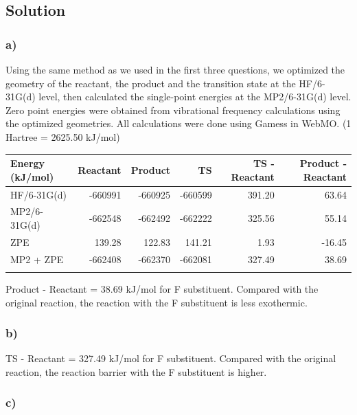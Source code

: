 \documentclass[11pt]{article}
\begin{document}
\subsection{Solution}
\label{sec:orgdc02afd}

\subsubsection{a)}
\label{sec:orga95c7f9}

Using the same method as we used in the first three questions, we optimized the geometry of the reactant, the product and the transition state at the HF/6-31G(d) level, then calculated the single-point energies at the MP2/6-31G(d) level. Zero point energies were obtained from vibrational frequency calculations using the optimized geometries. All calculations were done using Gamess in WebMO. (1 Hartree = 2625.50 kJ/mol)

\begin{center}
\begin{tabular}{lrrrrr}
\hline
Energy (kJ/mol) & Reactant & Product & TS & TS - Reactant & Product - Reactant\\
\hline
HF/6-31G(d) & -660991 & -660925 & -660599 & 391.20 & 63.64\\
MP2/6-31G(d) & -662548 & -662492 & -662222 & 325.56 & 55.14\\
ZPE & 139.28 & 122.83 & 141.21 & 1.93 & -16.45\\
MP2 + ZPE & -662408 & -662370 & -662081 & 327.49 & 38.69\\
 &  &  &  &  & \\
\hline
\end{tabular}
\end{center}
Product - Reactant = 38.69 kJ/mol for F substituent.
Compared with the original reaction, the reaction with the F substituent is less exothermic.

\subsubsection{b)}
\label{sec:org4ea3194}

TS - Reactant = 327.49 kJ/mol for F substituent.
Compared with the original reaction, the reaction barrier with the F substituent is higher. 

\subsubsection{c)}
\label{sec:org7ff4914}
\end{document}
